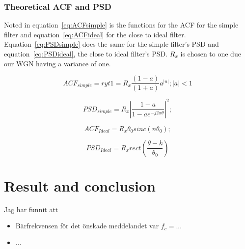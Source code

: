 \documentclass[10pt]{article}
\begin{document}
\subsubsection{Theoretical ACF and PSD}
Noted in equation~\ref{eq:ACFsimple} is the functions for the ACF
for the simple filter and equation~\ref{eq:ACFideal} for the close to ideal filter.
Equation~\ref{eq:PSDsimple} does the same for the simple filter's PSD
and equation~\ref{eq:PSDideal}, the close to ideal filter's PSD.
$R_x$ is chosen to one due our WGN having a variance of one.

\begin{equation}
  \label{eq:ACFsimple}
  ACF_{simple} = ryt1 = R_x\frac{(1-a)}{(1+a)}a^{|n|};  |a| < 1
\end{equation}

\begin{equation}
  \label{eq:PSDsimple}
  PSD_{simple} =  R_x|\frac{1-a}{1-ae^{-j2\pi\theta}}|^2;
\end{equation}

\begin{equation}
  \label{eq:ACFideal}
  ACF_{Ideal} = R_x\theta_{0}sinc(n\theta_0);
\end{equation}

\begin{equation}
  \label{eq:PSDideal}
  PSD_{Ideal} = R_xrect(\frac{\theta - k}{\theta_0})
\end{equation}


\section{Result and conclusion}

Jag har funnit att
\begin{itemize}
\item B\"arfrekvensen f\"or det \"onskade meddelandet var $f_c=...$
\item ...
\end{itemize}
\clearpage
\end{document}
